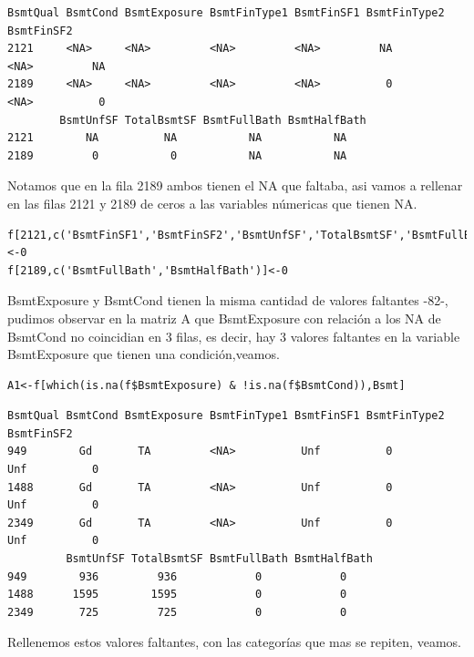 \documentclass{report}
\begin{document}
\begin{itemize}
\begin{itemize}
\begin{itemize}
\begin{lstlisting}[frame=single]
       BsmtQual BsmtCond BsmtExposure BsmtFinType1 BsmtFinSF1 BsmtFinType2 BsmtFinSF2
2121     <NA>     <NA>         <NA>         <NA>         NA         <NA>         NA
2189     <NA>     <NA>         <NA>         <NA>          0         <NA>          0
        BsmtUnfSF TotalBsmtSF BsmtFullBath BsmtHalfBath
2121        NA          NA           NA           NA
2189         0           0           NA           NA
\end{lstlisting}
\vspace{2mm}
Notamos que en la fila 2189 ambos tienen el NA que faltaba, asi vamos a rellenar en las filas 2121 y 2189 de ceros a las variables númericas que tienen NA.\\

\begin{lstlisting}[frame=single]
f[2121,c('BsmtFinSF1','BsmtFinSF2','BsmtUnfSF','TotalBsmtSF','BsmtFullBath','BsmtHalfBath')]<-0
f[2189,c('BsmtFullBath','BsmtHalfBath')]<-0
\end{lstlisting}
\vspace{2mm}

BsmtExposure y BsmtCond tienen la misma cantidad de valores faltantes -82-, pudimos observar en la matriz A que BsmtExposure con relación a los NA de BsmtCond no coincidian en 3 filas, es decir, hay 3 valores faltantes en la variable BsmtExposure que tienen una condición,veamos.\\

\begin{lstlisting}[frame=single]
A1<-f[which(is.na(f$BsmtExposure) & !is.na(f$BsmtCond)),Bsmt]
\end{lstlisting}

\begin{lstlisting}[frame=single]
         BsmtQual BsmtCond BsmtExposure BsmtFinType1 BsmtFinSF1 BsmtFinType2 BsmtFinSF2
949        Gd       TA         <NA>          Unf          0          Unf          0
1488       Gd       TA         <NA>          Unf          0          Unf          0
2349       Gd       TA         <NA>          Unf          0          Unf          0
         BsmtUnfSF TotalBsmtSF BsmtFullBath BsmtHalfBath
949        936         936            0            0
1488      1595        1595            0            0
2349       725         725            0            0
\end{lstlisting}
\vspace{2mm}

Rellenemos estos valores faltantes, con las categorías que mas se repiten, veamos.\\


\end{itemize}
\end{itemize}
\end{itemize}
\end{document}
